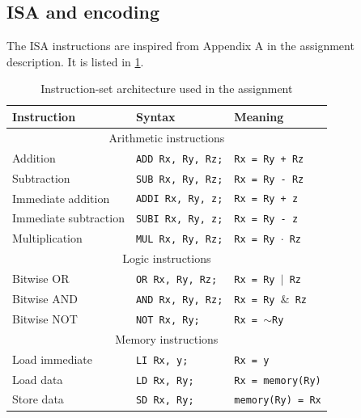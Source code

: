 \documentclass[a4paper, english]{article}
\numberwithin{equation}{section}
\begin{document}
\subsection{ISA and encoding}\label{sec:isa}
The ISA instructions are inspired from Appendix A in the assignment description. It is listed in \cref{tbl:ISA}.
\begin{table}[H]
    \centering
    \caption{Instruction-set architecture used in the assignment}\label{tbl:ISA}
    \begin{tabular}{lll}
        \toprule
        \textbf{Instruction}  & \textbf{Syntax}          & \textbf{Meaning}                  \\
        \midrule
        \multicolumn{3}{c}{Arithmetic instructions}                                          \\
        \midrule
        Addition              & \texttt{ADD Rx, Ry, Rz;} & \texttt{Rx = Ry + Rz}             \\
        Subtraction           & \texttt{SUB Rx, Ry, Rz;} & \texttt{Rx = Ry - Rz}             \\
        Immediate addition    & \texttt{ADDI Rx, Ry, z;} & \texttt{Rx = Ry + z}              \\
        Immediate subtraction & \texttt{SUBI Rx, Ry, z;} & \texttt{Rx = Ry - z}              \\
        Multiplication        & \texttt{MUL Rx, Ry, Rz;} & \texttt{Rx = Ry \(\cdot\) Rz}     \\
        \midrule
        \multicolumn{3}{c}{Logic instructions}                                               \\
        \midrule
        Bitwise OR            & \texttt{OR Rx, Ry, Rz;}  & \texttt{Rx = Ry \(\vert\) Rz}     \\
        Bitwise AND           & \texttt{AND Rx, Ry, Rz;} & \texttt{Rx = Ry \(\&\) Rz}        \\
        Bitwise NOT           & \texttt{NOT Rx, Ry;}     & \texttt{Rx = \(\sim\)Ry}          \\
        \midrule
        \multicolumn{3}{c}{Memory instructions}                                              \\
        \midrule
        Load immediate        & \texttt{LI Rx, y;}       & \texttt{Rx = y}                   \\
        Load data             & \texttt{LD Rx, Ry;}      & \texttt{Rx = memory(Ry)}          \\
        Store data            & \texttt{SD Rx, Ry;}      & \texttt{memory(Ry) = Rx}          \\

\end{tabular}
\end{table}
\end{document}

